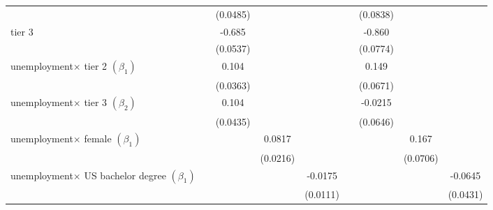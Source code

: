 \begin{table}[htbp]
\begin{adjustbox}{max width=0.95\textwidth}
\begin{tabular}{l*{8}{c}}
            &                     &    (0.0485)         &                     &                     &                     &    (0.0838)         &                     &                     \\
[1em]
tier 3     &                     &      -0.685\sym{***}&                     &                     &                     &      -0.860\sym{***}&                     &                     \\
            &                     &    (0.0537)         &                     &                     &                     &    (0.0774)         &                     &                     \\
[1em]
unemployment$\times$ tier 2 $\left( \beta_1 \right)$&                     &       0.104\sym{***}&                     &                     &                     &       0.149\sym{**} &                     &                     \\
            &                     &    (0.0363)         &                     &                     &                     &    (0.0671)         &                     &                     \\
[1em]
unemployment$\times$ tier 3 $\left( \beta_2 \right)$&                     &       0.104\sym{**} &                     &                     &                     &     -0.0215         &                     &                     \\
            &                     &    (0.0435)         &                     &                     &                     &    (0.0646)         &                     &                     \\
[1em]
unemployment$\times$ female $\left( \beta_1 \right)$&                     &                     &      0.0817\sym{***}&                     &                     &                     &       0.167\sym{**} &                     \\
            &                     &                     &    (0.0216)         &                     &                     &                     &    (0.0706)         &                     \\
[1em]
unemployment$\times$ US bachelor degree $\left( \beta_1 \right)$&                     &                     &                     &     -0.0175         &                     &                     &                     &     -0.0645         \\
            &                     &                     &                     &    (0.0111)         &                     &                     &                     &    (0.0431)         \\

\end{tabular}
\end{adjustbox}
\end{table}
